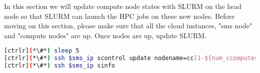         In this section we will update compute node states with SLURM on the head node so that SLURM can launch the HPC jobs on these new nodes.
        Before moving on this section, please make sure that all the cloud instances, "sms node" and "compute nodes" are up. Once nodes are up, update SLURM.



\begin{lstlisting}[language=bash,keywords={}]
[ctrlr](*\#*) sleep 5
[ctrlr](*\#*) ssh $sms_ip scontrol update nodename=cc[1-${num_ccomputes}] state=idle
[ctrlr](*\#*) ssh $sms_ip sinfo
\end{lstlisting}
